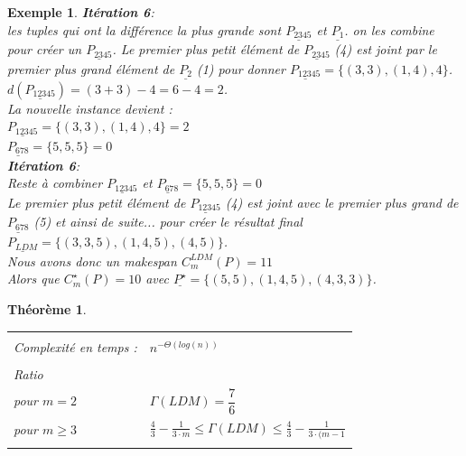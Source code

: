 \documentclass[a4paper,12pt]{report}
\theoremstyle{plain}				%
\newtheorem{theoreme}{Théorème}	%
\newtheorem{example}{Exemple}
\theoremstyle{definition}				%
\begin{document}
\begin{itemize}
\begin{example}
\textbf{Itération 6}:\\
les tuples qui ont la différence la plus grande sont 
$\underline{P_{2345}}$  et $\underline{P_{1}}$. 
on les combine pour créer un $\underline{P_{2345}}$. Le premier plus petit élément de $\underline{P_{2345}}$ (4) est joint par le premier plus grand élément de $\underline{P_{2}}$ (1) pour donner  $\underline{P_{12345}} = \{(3,3),(1,4),4\}$.  
$d(\underline{P_{12345}}) = (3+3)-4 = 6-4=2$.\\
La nouvelle instance devient :\\
$\underline{P_{12345}} = \{(3,3),(1,4),4\}=2$\\
$\underline{P_{678}} = \{5,5,5\}=0$\\

\textbf{Itération 6}:\\
Reste à combiner $\underline{P_{12345}}$ et $\underline{P_{678}} = \{5,5,5\}=0$\\
Le premier plus petit élément de $\underline{P_{12345}}$ (4) est joint avec le premier plus grand de  $\underline{P_{678}}$ (5) et ainsi de suite... pour créer le résultat final \\
$\underline{P_{LDM}}= \{(3,3,5),(1,4,5),(4,5)\}$.\\
 
Nous avons donc un makespan $C_m^{LDM}(P) = 11 $ \\
Alors que $C_m^{\star}(P) = 10$ avec $\underline{P^{\star}}= \{(5,5),(1,4,5),(4,3,3)\}$.
\end{example}

\end{itemize}



\begin{theoreme}
\begin{flushleft}
\begin{tabular}{|p{8cm}p{6cm}|}
\hline
& \\
Complexité en temps \cite{michiels2003performance} :& $n^{- \Theta (log(n))}$
\\	%
& \\
Ratio \cite{michiels2003performance} &\\
pour $m=2$						& $\Gamma(LDM) = \dfrac{7}{6}$\\
pour $m\geq 3$					& $ \frac{4}{3}-\frac{1}{3 \cdot m} \leq
   									\Gamma(LDM) 						\leq 
   									\frac{4}{3}-\frac{1}{3 \cdot (m-1}$
\\
& \\
\hline
\end{tabular}
\end{flushleft}

\end{theoreme}
\end{document}
